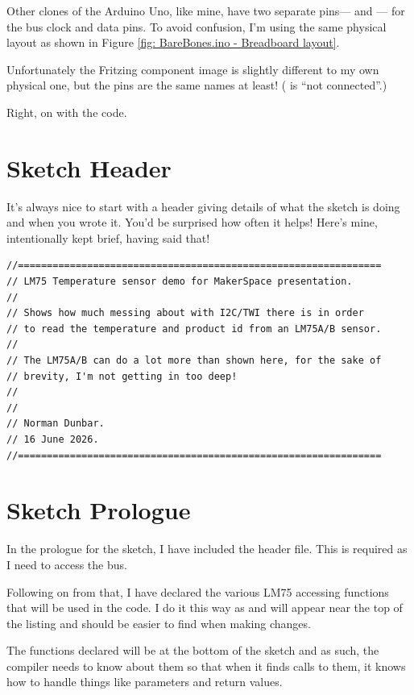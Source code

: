 Other clones of the Arduino Uno, like mine, have two separate pins--- and --- for the \twi{} bus clock and data pins. To avoid confusion, I'm using the same physical layout as shown in Figure \ref{fig: BareBones.ino - Breadboard layout}.

Unfortunately the Fritzing component image is slightly different to my own physical one, but the pins are the same names at least! ( is ``not connected''.)

Right, on with the code.

\section{Sketch Header}

It's always nice to start with a header giving details of what the sketch is doing and when you wrote it. You'd be surprised how often it helps! Here's mine, intentionally kept brief, having said that!

\begin{lstlisting}[caption={BareBones.ino - Header.},label={lst: BareBones.ino - Header}, style=myArduino, firstnumber=1]
//===============================================================
// LM75 Temperature sensor demo for MakerSpace presentation.
//
// Shows how much messing about with I2C/TWI there is in order
// to read the temperature and product id from an LM75A/B sensor.
//
// The LM75A/B can do a lot more than shown here, for the sake of
// brevity, I'm not getting in too deep!
//
//
// Norman Dunbar.
// 16 June 2026.
//===============================================================
\end{lstlisting}

\section{Sketch Prologue}

In the prologue for the sketch, I have included the  header file. This is required as I need to access the \twi{} bus.

Following on from that, I have declared the various LM75 accessing functions that will be used in the code. I do it this way as  and  will appear near the top of the listing and should be easier to find when making changes.

The functions declared will be at the bottom of the sketch and as such, the compiler needs to know about them so that when it finds calls to them, it knows how to handle things like parameters and return values.


